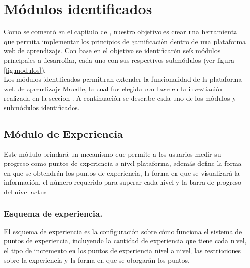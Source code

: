 
\section{Módulos identificados}
\label{analisis:modulos}

 Como se comentó en el capítulo de , nuestro
 objetivo es crear una herramienta que permita implementar los principios de
 gamificación dentro de una plataforma web de aprendizaje. Con base en el objetivo
 se identificarón seís módulos principales a desarrollar, cada uno con sus
 respectivos submódulos (ver figura \ref{fig:modulos}).\\

 \noindent
 Los módulos identificados permitiran extender la funcionalidad de la plataforma web
 de aprendizaje Moodle, la cual fue elegida con base en la investiación realizada en
 la seccion . A continuación se describe cada uno de los módulos y
 submódulos identificados.\\







\subsection{Módulo de Experiencia}
 \newcommand{\itemx}[1]{\item{\bf\color{primary}#1}}

 Este módulo brindará un mecanismo que permite a los usuarios medir su progreso
 como puntos de experiencia a nivel plataforma, además define la forma en que se
 obtendrán los puntos de experiencia, la forma en que se visualizará la información,
 el número requerido para superar cada nivel y la barra de progreso del nivel
 actual.

\subsubsection{Esquema de experiencia.}

 El esquema de experiencia es la configuración sobre cómo funciona el sistema
 de puntos de experiencia, incluyendo la cantidad de experiencia que tiene
 cada nivel, el tipo de incremento en los puntos de experiencia nivel a nivel,
 las restricciones sobre la experiencia y la forma en que se otorgarán los puntos.


